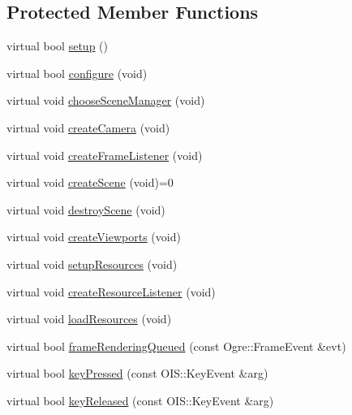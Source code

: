 \subsection*{Protected Member Functions}
\begin{DoxyCompactItemize}
\item 
virtual bool \mbox{\hyperlink{class_base_application_a5853d0e148cb85b0297a6885e1d33a89}{setup}} ()
\item 
virtual bool \mbox{\hyperlink{class_base_application_a62ed46f90e9f82cc810997647a2c587e}{configure}} (void)
\item 
virtual void \mbox{\hyperlink{class_base_application_ad5bc9655041e1849a4c13f444a3712bd}{choose\+Scene\+Manager}} (void)
\item 
virtual void \mbox{\hyperlink{class_base_application_afa9d51527763cf9aee9cd4e1b1039d55}{create\+Camera}} (void)
\item 
virtual void \mbox{\hyperlink{class_base_application_aff6fd9ff1ff0978cc68f19dd65be4778}{create\+Frame\+Listener}} (void)
\item 
virtual void \mbox{\hyperlink{class_base_application_aa97beeb4059b17d0ec22eae33286ec2d}{create\+Scene}} (void)=0
\item 
virtual void \mbox{\hyperlink{class_base_application_a365146059b25391fe400f5fdb94f011e}{destroy\+Scene}} (void)
\item 
virtual void \mbox{\hyperlink{class_base_application_a1f8f6730cae6ec769d8730b1af48486e}{create\+Viewports}} (void)
\item 
virtual void \mbox{\hyperlink{class_base_application_ae27301702f1e5de64619a39b1929f1f9}{setup\+Resources}} (void)
\item 
virtual void \mbox{\hyperlink{class_base_application_a9b77972f0f747a61e1f8ceba2ad47641}{create\+Resource\+Listener}} (void)
\item 
virtual void \mbox{\hyperlink{class_base_application_aaeb764e637dd87601a81a80156659d88}{load\+Resources}} (void)
\item 
virtual bool \mbox{\hyperlink{class_base_application_a03912a0f38b38fede7f08a2571e8fc56}{frame\+Rendering\+Queued}} (const Ogre\+::\+Frame\+Event \&evt)
\item 
virtual bool \mbox{\hyperlink{class_base_application_acfa977f04e435f18018ece805c1277ec}{key\+Pressed}} (const O\+I\+S\+::\+Key\+Event \&arg)
\item 
virtual bool \mbox{\hyperlink{class_base_application_aba5c7c9dea7a0efc58b89310bae547e5}{key\+Released}} (const O\+I\+S\+::\+Key\+Event \&arg)

\end{DoxyCompactItemize}
